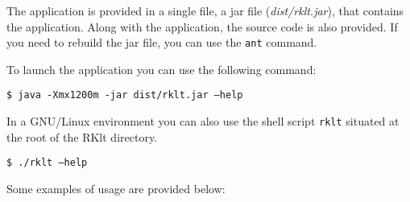 \documentclass[a4paper,10pt]{article}
\begin{document}
The application is provided in a single file, a jar file (\emph{dist/rklt.jar}), that contains the application.
Along with the application, the source code is also provided. If you need to rebuild the jar file, you can use the \texttt{ant} command.

To launch the application you can use the following command: 

\begin{framed}
\texttt{\$ java -Xmx1200m -jar dist/rklt.jar --help}
\end{framed}

In a GNU/Linux environment you can also use the shell script \texttt{rklt} situated at the root of the RKlt directory. 

\begin{framed}
\texttt{\$ ./rklt --help}
\end{framed}

Some examples of usage are provided below:
\end{document}

